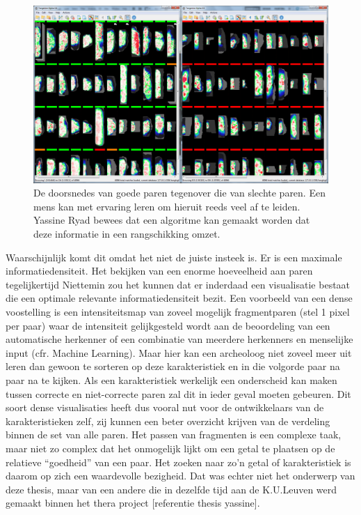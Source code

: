 \begin{figure}[ht]
	\begin{center}
		\includegraphics[width=1.0\columnwidth]{images/tileview-reduced-compare-01.png}
		\caption{De doorsnedes van goede paren tegenover die van slechte paren. Een mens kan met ervaring leren om hieruit reeds veel af te leiden. Yassine Ryad bewees dat een algoritme kan gemaakt worden dat deze informatie in een rangschikking omzet.~\cite{Ryad2011}}
		\label{fig:tileview-reduced-compare}
	\end{center}
\end{figure}

Waarschijnlijk komt dit omdat het niet de juiste insteek is. Er is een maximale informatiedensiteit. Het bekijken van een enorme hoeveelheid aan paren tegelijkertijd Niettemin zou het kunnen dat er inderdaad een visualisatie bestaat die een optimale relevante informatiedensiteit bezit. Een voorbeeld van een dense voostelling is een intensiteitsmap van zoveel mogelijk fragmentparen (stel 1 pixel per paar) waar de intensiteit gelijkgesteld wordt aan de beoordeling van een automatische herkenner of een combinatie van meerdere herkenners en menselijke input (cfr. Machine Learning)\cite{Funkhouser2011}. Maar hier kan een archeoloog niet zoveel meer uit leren dan gewoon te sorteren op deze karakteristiek en in die volgorde paar na paar na te kijken. Als een karakteristiek werkelijk een onderscheid kan maken tussen correcte en niet-correcte paren zal dit in ieder geval moeten gebeuren. Dit soort dense visualisaties heeft dus vooral nut voor de ontwikkelaars van de karakteristieken zelf, zij kunnen een beter overzicht krijven van de verdeling binnen de set van alle paren. Het passen van fragmenten is een complexe taak, maar niet zo complex dat het onmogelijk lijkt om een getal te plaatsen op de relatieve ``goedheid'' van een paar. Het zoeken naar zo'n getal of karakteristiek is daarom op zich een waardevolle bezigheid. Dat was echter niet het onderwerp van deze thesis, maar van een andere die in dezelfde tijd aan de K.U.Leuven werd gemaakt binnen het thera project [referentie thesis yassine].\\

